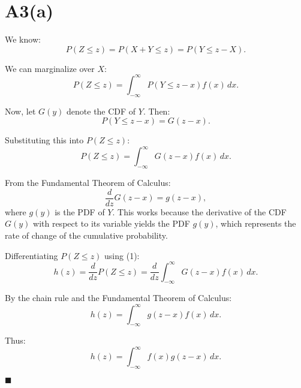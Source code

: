 \documentclass{article}
\begin{document}
\section*{A3(a)}

We know:
\[
P(Z \leq z) = P(X + Y \leq z) = P(Y \leq z - X).
\]

We can marginalize over \( X \):
\[
P(Z \leq z) = \int_{-\infty}^\infty P(Y \leq z - x) f(x) \, dx.
\]

Now, let \( G(y) \) denote the CDF of \( Y \). Then:
\[
P(Y \leq z - x) = G(z - x).
\]

Substituting this into \( P(Z \leq z) \):
\[
P(Z \leq z) = \int_{-\infty}^\infty G(z - x) f(x) \, dx. \tag{1}
\]

From the Fundamental Theorem of Calculus:
\[
\frac{d}{dz} G(z - x) = g(z - x),
\]
where \( g(y) \) is the PDF of \( Y \). This works because the derivative of the CDF \( G(y) \) with respect to its variable yields the PDF \( g(y) \), which represents the rate of change of the cumulative probability.

Differentiating \( P(Z \leq z) \) using (1):
\[
h(z) = \frac{d}{dz} P(Z \leq z) = \frac{d}{dz} \int_{-\infty}^\infty G(z - x) f(x) \, dx.
\]

By the chain rule and the Fundamental Theorem of Calculus:
\[
h(z) = \int_{-\infty}^\infty g(z - x) f(x) \, dx.
\]

Thus:
\[
h(z) = \int_{-\infty}^\infty f(x) g(z - x) \, dx.
\]

\hfill\(\blacksquare\)
\end{document}
